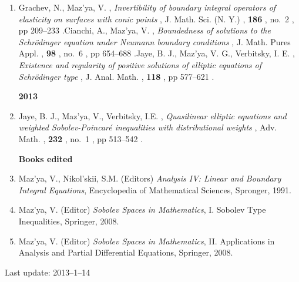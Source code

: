 \documentclass{article}
\newcommand{\authors}[1]{\item #1\ignorespaces}
\renewcommand{\title}[1]{, \textit{#1}\ignorespaces}
\newcommand{\journal}[1]{, {#1}\ignorespaces}
\newcommand{\volume}[1]{, \textbf{#1}\ignorespaces}
\newcommand{\no}[1]{, no.~{#1}\ignorespaces}
\newcommand{\pages}[1]{, pp #1\ignorespaces}
\newcommand{\jitem}[1]{.}
\begin{document}
\begin{enumerate}
\authors{Grachev, N.,  Maz'ya, V.}
\title{Invertibility of boundary   integral operators of elasticity on surfaces with conic points}
\journal{J. Math. Sci. (N. Y.)}
\volume{186}
\no{2}
\pages{209--233}
 \jitem
 
 \authors{Cianchi, A.,  Maz'ya, V.}
 \title{Boundedness of solutions to the Schr\"odinger equation under Neumann boundary conditions}
 \journal{J. Math. Pures Appl.}
 \volume{98} 
 \no{6}
 \pages{654--688}
  \jitem 

 \authors{Jaye, B. J.,  Maz'ya, V. G.,  Verbitsky, I. E.}
 \title{Existence and regularity of positive solutions of elliptic equations of Schr\"odinger type}
 \journal{J. Anal. Math.}
 \volume{118}
 \pages{ 577--621}
  \jitem 

\medskip

{\bf 2013}

 \authors{Jaye, B. J.,  Maz'ya, V.,  Verbitsky, I.E.}
 \title{Quasilinear elliptic equations and weighted Sobolev-Poincar\'e inequalities with distributional weights}
 \journal{Adv. Math.}
 \volume{232}
 \no{1}
 \pages{513--542}
 \jitem



\bigskip

\textbf{\large Books edited}

\item Maz'ya, V., Nikol'skii, S.M. (Editors) {\it Analysis IV: Linear and Boundary Integral Equations}, Encyclopedia of Mathematical Sciences, Spronger, 1991.

\item Maz'ya, V. (Editor)
 {\it Sobolev Spaces in Mathematics},  I. Sobolev Type Inequalities, Springer,  2008.

\item Maz'ya, V. (Editor)
 {\it Sobolev Spaces in Mathematics},  II. Applications in Analysis and Partial Differential Equations, Springer,  2008.

 

\end{enumerate}

Last update: 2013--1--14
\end{document}
